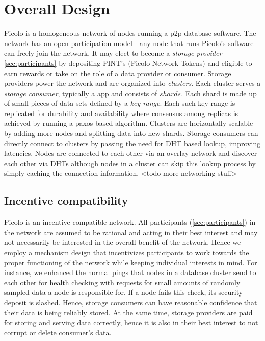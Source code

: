 \section{Overall Design}
Picolo is a homogeneous network of nodes running a p2p database software. The network has an open participation model - any node that runs Picolo's software can freely join the network. It may elect to become a \textit{storage provider} \cref{sec:participants} by depositing PINT's (Picolo Network Tokens) and eligible to earn rewards or take on the role of a data provider or consumer. Storage providers power the network and are organized into \textit{clusters}. Each cluster serves a \textit{storage consumer}, typically a \DJ app and consists of $shards$. Each shard is made up of small pieces of data sets defined by a \textit{key range}. Each such key range is replicated for durability and availability where consensus among replicas is achieved by running a paxos based algorithm. Clusters are horizontally scalable by adding more nodes and splitting data into new shards. Storage consumers can directly connect to clusters by passing the need for DHT based lookup, improving latencies.
\newline\newline
Nodes are connected to each other via an overlay network and discover each other via DHTs although nodes in a cluster can skip this lookup process by simply caching the connection information. <todo more networking stuff>

\subsection{Incentive compatibility}
Picolo is an incentive compatible network. All participants (\cref{sec:participants}) in the network are assumed to be rational and acting in their best interest and may not necessarily be interested in the overall benefit of the network. Hence we employ a mechanism design that incentivizes participants to work towards the proper functioning of the network while keeping individual interests in mind. For instance, we enhanced the normal pings that nodes in a database cluster send to each other for health checking with requests for small amounts of randomly sampled data a node is responsible for. If a node fails this check, its security deposit is slashed. Hence, storage consumers can have reasonable confidence that their data is being reliably stored. At the same time, storage providers are paid for storing and serving data correctly, hence it is also in their best interest to not corrupt or delete consumer's data.

